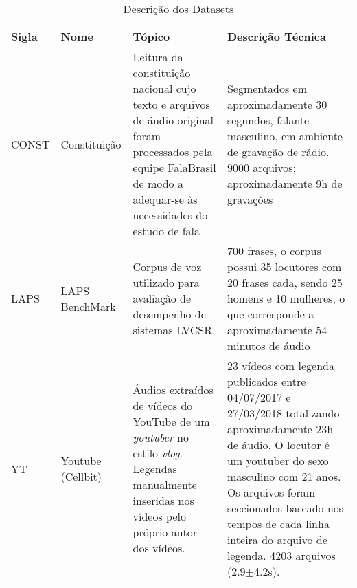 \documentclass{article}
\begin{document}
\begin{center}
	\begin{table}[h!]
		\begin{tabular}{p{1cm}p{2cm}p{5cm}p{6cm}}
			\hline
			Sigla & Nome              & Tópico                                                                                                                                                                                            & Descrição Técnica                                                                                                                                                                                                                                                                           \\ \hline
			CONST & Constituição      & Leitura da constituição nacional cujo texto e arquivos de áudio original foram processados pela equipe FalaBrasil de modo a adequar-se às necessidades do estudo de fala                          & Segmentados em aproximadamente 30 segundos, falante masculino, em ambiente de gravação de rádio. 9000 arquivos; aproximadamente 9h de gravações                                                                                                                      \\
			\hline
			LAPS  & LAPS BenchMark    & Corpus de voz utilizado para avaliação de desempenho de sistemas LVCSR.                                                                                                                           & 700 frases, o corpus possui 35 locutores com 20 frases cada, sendo 25 homens e 10 mulheres, o que corresponde a aproximadamente 54 minutos de áudio                                                                                                                                         \\ \hline
			YT    & Youtube (Cellbit) & Áudios extraídos de vídeos do YouTube de um \textit{youtuber} no estilo \textit{vlog}. Legendas manualmente inseridas nos vídeos pelo próprio autor dos vídeos. & 23 vídeos com legenda publicados entre 04/07/2017 e 27/03/2018 totalizando aproximadamente 23h de áudio. O locutor é um youtuber do sexo masculino com 21 anos. Os arquivos foram seccionados baseado nos tempos de cada linha inteira do arquivo de legenda. 4203 arquivos (2.9$\pm$4.2s). \\ \hline
		\end{tabular}
		\caption{Descrição dos Datasets}
		\label{tab:datasets}
	\end{table}
\end{center}
\end{document}
